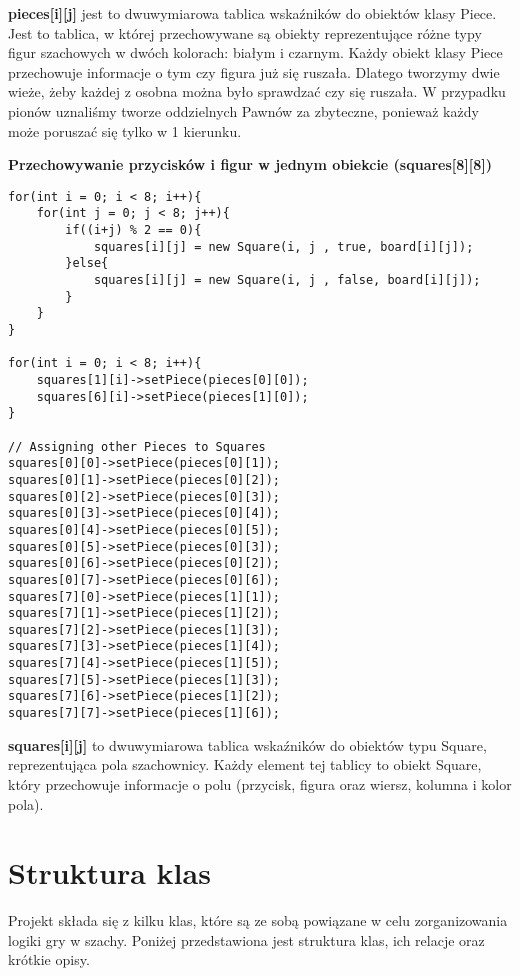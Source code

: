 \documentclass[]{report}
\begin{document}
\textbf{pieces[i][j]} jest to dwuwymiarowa tablica wskaźników do obiektów klasy Piece. Jest to tablica, w której przechowywane są obiekty reprezentujące różne typy figur szachowych w dwóch kolorach: białym i czarnym. Każdy obiekt klasy Piece przechowuje informacje o tym czy figura już się ruszała. Dlatego tworzymy dwie wieże, żeby każdej z osobna można było sprawdzać czy się ruszała. W przypadku pionów uznaliśmy tworze oddzielnych Pawnów za zbyteczne, ponieważ każdy może poruszać się tylko w 1 kierunku.
\begin{flushleft}
\textbf{Przechowywanie przycisków i figur w jednym obiekcie (squares[8][8])}
\end{flushleft}
\begin{lstlisting}
for(int i = 0; i < 8; i++){
	for(int j = 0; j < 8; j++){
		if((i+j) % 2 == 0){
			squares[i][j] = new Square(i, j , true, board[i][j]);
		}else{
			squares[i][j] = new Square(i, j , false, board[i][j]);
		}
	}
}

for(int i = 0; i < 8; i++){
	squares[1][i]->setPiece(pieces[0][0]);
	squares[6][i]->setPiece(pieces[1][0]);
}

// Assigning other Pieces to Squares
squares[0][0]->setPiece(pieces[0][1]);
squares[0][1]->setPiece(pieces[0][2]);
squares[0][2]->setPiece(pieces[0][3]);
squares[0][3]->setPiece(pieces[0][4]);
squares[0][4]->setPiece(pieces[0][5]);
squares[0][5]->setPiece(pieces[0][3]);
squares[0][6]->setPiece(pieces[0][2]);
squares[0][7]->setPiece(pieces[0][6]);
squares[7][0]->setPiece(pieces[1][1]);
squares[7][1]->setPiece(pieces[1][2]);
squares[7][2]->setPiece(pieces[1][3]);
squares[7][3]->setPiece(pieces[1][4]);
squares[7][4]->setPiece(pieces[1][5]);
squares[7][5]->setPiece(pieces[1][3]);
squares[7][6]->setPiece(pieces[1][2]);
squares[7][7]->setPiece(pieces[1][6]);
\end{lstlisting}
\begin{flushleft}
\textbf{squares[i][j]} to dwuwymiarowa tablica wskaźników do obiektów typu Square, reprezentująca pola szachownicy. Każdy element tej tablicy to obiekt Square, który przechowuje informacje o polu (przycisk, figura oraz wiersz, kolumna i kolor pola).
\end{flushleft}
\section*{Struktura klas}

Projekt składa się z kilku klas, które są ze sobą powiązane w celu zorganizowania logiki gry w szachy. Poniżej przedstawiona jest struktura klas, ich relacje oraz krótkie opisy.\vspace{\baselineskip}
\end{document}

